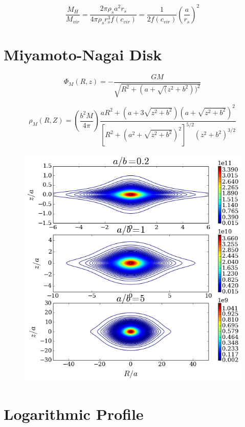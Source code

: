 \documentclass[a4paper, 12pt]{article} %
\begin{document}
\begin{equation}
\dfrac{M_H}{M_{vir}} = \dfrac{2 \pi \rho_s a^2 r_s}{4 \pi \rho_s r_s^3 f(c_{vir})} = \dfrac{1}{2 f(c_{vir})}  \left( \dfrac{a}{r_s}\right)^2
\end{equation}

\section{Miyamoto-Nagai Disk}

\begin{equation}
\Phi_M (R, z) = - \dfrac{GM}{\sqrt{R^2 + (a + \sqrt(z^2 + b^2))^2}}
\end{equation}

\begin{equation}
\rho_M (R, Z) = \left( \dfrac{b^2 M}{4 \pi} \right) \dfrac{aR^2 + (a + 3\sqrt{z^2+b^2})(a + \sqrt{z^2+b^2})^2}{[R^2 + (a^2 + \sqrt{z^2+b^2})^2]^{5/2}(z^2+b^2)^{3/2} }
\end{equation}


\begin{figure}[H]\label{fig:MN_density}
\centering
\includegraphics[scale=0.7]{MN_density_contours.png}
\end{figure}

\section{Logarithmic Profile}
\end{document}
